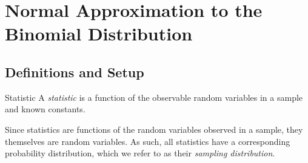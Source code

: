 \setcounter{chapter}{3} %
\chapter{Normal Approximation to the Binomial Distribution}

\section{Definitions and Setup}

\begin{definitionbox}{Statistic}
A \textit{statistic} is a function of the observable random variables in a sample and known constants.

Since statistics are functions of the random variables observed in a sample, they themselves are random variables. As such, all statistics have a corresponding probability distribution, which we refer to as their \textit{sampling distribution}.
\end{definitionbox}
